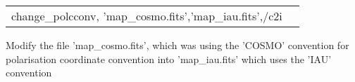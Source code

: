 \begin{example}
{
\begin{tabular}{ll} %
change\_polcconv, 'map\_cosmo.fits','map\_iau.fits',/c2i
\end{tabular}
}
{ Modify the file 'map\_cosmo.fits', which was using the 'COSMO' convention for
  polarisation coordinate convention into 'map\_iau.fits' which uses the 'IAU' convention
}
\end{example}


